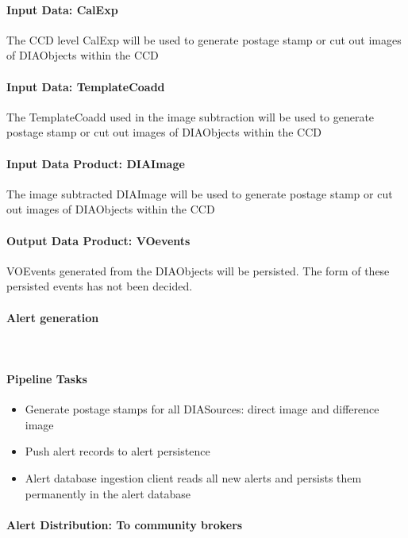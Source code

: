 \paragraph{Input Data: CalExp}

The CCD level CalExp will be used to generate postage stamp or cut out images of DIAObjects  within the CCD

\paragraph{Input Data: TemplateCoadd}

The TemplateCoadd used in the image subtraction will be used to  generate postage stamp or cut out images of DIAObjects   within the CCD


\paragraph{Input Data Product: DIAImage}

The image subtracted DIAImage will be used to  generate postage stamp or cut out images of DIAObjects within the CCD

\paragraph{Output Data Product: VOevents}

VOEvents generated from the DIAObjects will be persisted. The form of these persisted events has  not been decided.

\paragraph{Alert generation}~

\paragraph{Pipeline Tasks}
 \begin{itemize}
\item Generate postage stamps for all DIASources: direct image and difference image
\item Push alert records to alert persistence
\item Alert database ingestion client reads all new alerts and persists them permanently in the alert database
\end{itemize}

\paragraph{Alert Distribution: To community brokers}

